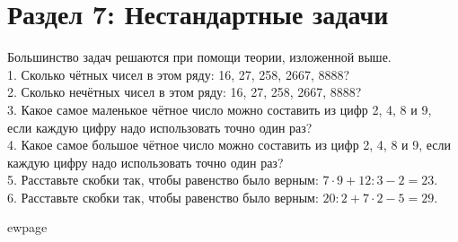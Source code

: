 \section{Раздел 7: Нестандартные задачи}
Большинство задач решаются при помощи теории, изложенной выше.\\
1. Сколько чётных чисел в этом ряду: 16, 27, 258, 2667, 8888?\\
2. Сколько нечётных чисел в этом ряду: 16, 27, 258, 2667, 8888?\\
3. Какое самое маленькое чётное число можно составить из цифр 2, 4, 8 и 9, если каждую цифру надо использовать точно один раз?\\
4. Какое самое большое чётное число можно составить из цифр 2, 4, 8 и 9, если каждую цифру надо использовать точно один раз?\\
5. Расставьте скобки так, чтобы равенство было верным: $7\cdot9+12:3-2=23.$\\
6. Расставьте скобки так, чтобы равенство было верным: $20:2+7\cdot2-5=29.$

ewpage

